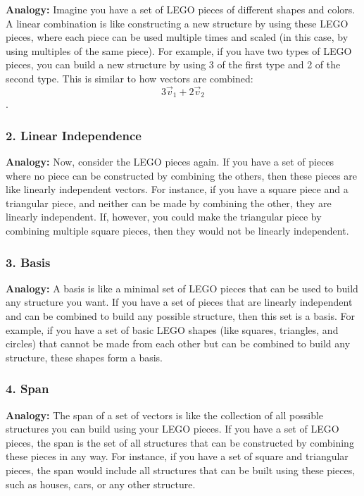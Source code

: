 \documentclass[11pt]{article}
\begin{document}
\textbf{Analogy:} Imagine you have a set of LEGO pieces of different
shapes and colors. A linear combination is like constructing a new
structure by using these LEGO pieces, where each piece can be used
multiple times and scaled (in this case, by using multiples of the same
piece). For example, if you have two types of LEGO pieces, you can build
a new structure by using 3 of the first type and 2 of the second type.
This is similar to how vectors are combined:
\[3\vec{v}_1 + 2\vec{v}_2\].

\hypertarget{linear-independence}{%
\subsubsection{\texorpdfstring{2. \textbf{Linear
Independence}}{2. Linear Independence}}\label{linear-independence}}

\textbf{Analogy:} Now, consider the LEGO pieces again. If you have a set
of pieces where no piece can be constructed by combining the others,
then these pieces are like linearly independent vectors. For instance,
if you have a square piece and a triangular piece, and neither can be
made by combining the other, they are linearly independent. If, however,
you could make the triangular piece by combining multiple square pieces,
then they would not be linearly independent.

\hypertarget{basis}{%
\subsubsection{\texorpdfstring{3.
\textbf{Basis}}{3. Basis}}\label{basis}}

\textbf{Analogy:} A basis is like a minimal set of LEGO pieces that can
be used to build any structure you want. If you have a set of pieces
that are linearly independent and can be combined to build any possible
structure, then this set is a basis. For example, if you have a set of
basic LEGO shapes (like squares, triangles, and circles) that cannot be
made from each other but can be combined to build any structure, these
shapes form a basis.

\hypertarget{span}{%
\subsubsection{\texorpdfstring{4. \textbf{Span}}{4. Span}}\label{span}}

\textbf{Analogy:} The span of a set of vectors is like the collection of
all possible structures you can build using your LEGO pieces. If you
have a set of LEGO pieces, the span is the set of all structures that
can be constructed by combining these pieces in any way. For instance,
if you have a set of square and triangular pieces, the span would
include all structures that can be built using these pieces, such as
houses, cars, or any other structure.
\end{document}
